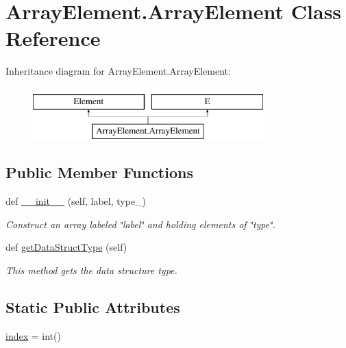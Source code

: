 \hypertarget{class_array_element_1_1_array_element}{}\section{Array\+Element.\+Array\+Element Class Reference}
\label{class_array_element_1_1_array_element}
Inheritance diagram for Array\+Element.\+Array\+Element\+:\begin{figure}[H]
\begin{center}
\leavevmode
\includegraphics[height=2.000000cm]{class_array_element_1_1_array_element}
\end{center}
\end{figure}
\subsection*{Public Member Functions}
\begin{DoxyCompactItemize}
\item 
def \hyperlink{class_array_element_1_1_array_element_af3861098177a59070ea1fa62377e59bd}{\+\_\+\+\_\+init\+\_\+\+\_\+} (self, label, type\+\_\+)
\begin{DoxyCompactList}\small\item\em Construct an array labeled \char`\"{}label\char`\"{} and holding elements of \char`\"{}type\char`\"{}. \end{DoxyCompactList}\item 
def \hyperlink{class_array_element_1_1_array_element_a268f5beb2259a5e0773017efb378485c}{get\+Data\+Struct\+Type} (self)
\begin{DoxyCompactList}\small\item\em This method gets the data structure type. \end{DoxyCompactList}\end{DoxyCompactItemize}
\subsection*{Static Public Attributes}
\begin{DoxyCompactItemize}
\item 
\hyperlink{class_array_element_1_1_array_element_a52ac2ef65a0cfac9079a4ea0ad7b1ee0}{index} = int()
\end{DoxyCompactItemize}


